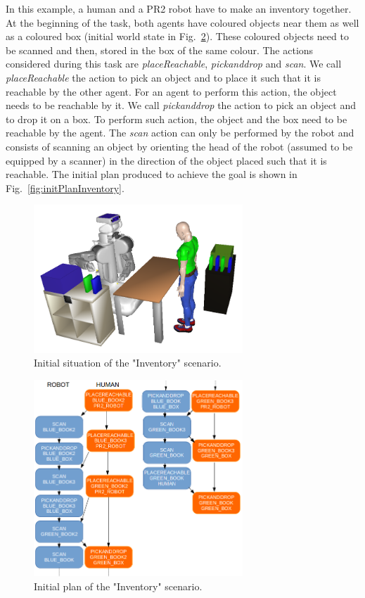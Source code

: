\documentclass[english,a4paper,11pt,twoside]{StyleThese}
\begin{document}
In this example, a human and a PR2 robot have to make an inventory together. At the beginning of the task, both agents have coloured objects near them as well as a coloured box (initial world state in Fig.~\ref{fig:initInventory}). These coloured objects need to be scanned and then, stored in the box of the same colour. The actions considered during this task are \textit{placeReachable}, \textit{pickanddrop} and \textit{scan}. We call \textit{placeReachable} the action to pick an object and to place it such that it is reachable by the other agent. For an agent to perform this action, the object needs to be reachable by it. We call \textit{pickanddrop} the action to pick an object and to drop it on a box. To perform such action, the object and the box need to be reachable by the agent. The \textit{scan} action can only be performed by the robot and consists of scanning an object by orienting the head of the robot (assumed to be equipped by a scanner) in the direction of the object placed such that it is reachable.  The initial plan produced to achieve the goal is shown in  Fig.~\ref{fig:initPlanInventory}.

\begin{figure}[!h]
	\centering
    \includegraphics[width=0.7\textwidth]{figs/Chapter3/initInventory.png}
    \caption{Initial situation of the "Inventory" scenario.}
    \label{fig:initInventory}
\end{figure}

\begin{figure}[!h]
	\centering
    \includegraphics[width=0.7\textwidth]{figs/Chapter3/planInventory.png}
    \caption{Initial plan of the "Inventory" scenario.}
    \label{fig:initInventory}
\end{figure}
\end{document}
